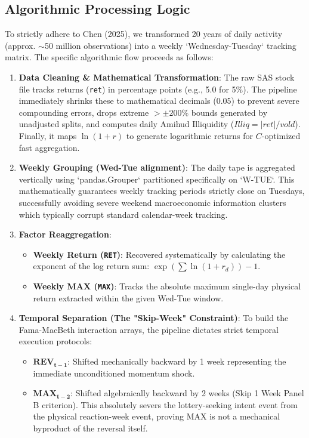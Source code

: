 \documentclass[11pt,a4paper]{article}
\begin{document}
\subsection{Algorithmic Processing Logic}
To strictly adhere to Chen (2025), we transformed 20 years of daily activity (approx. $\sim$50 million observations) into a weekly `Wednesday-Tuesday` tracking matrix. The specific algorithmic flow proceeds as follows:

\begin{enumerate}
    \item \textbf{Data Cleaning \& Mathematical Transformation}: The raw SAS stock file tracks returns (\texttt{ret}) in percentage points (e.g., 5.0 for 5\%). The pipeline immediately shrinks these to mathematical decimals ($0.05$) to prevent severe compounding errors, drops extreme $>\pm200\%$ bounds generated by unadjusted splits, and computes daily Amihud Illiquidity ($Illiq = |ret| / vold$). Finally, it maps $\ln(1+r)$ to generate logarithmic returns for $C$-optimized fast aggregation.
    \item \textbf{Weekly Grouping (Wed-Tue alignment)}: The daily tape is aggregated vertically using `pandas.Grouper` partitioned specifically on `W-TUE`. This mathematically guarantees weekly tracking periods strictly close on Tuesdays, successfully avoiding severe weekend macroeconomic information clusters which typically corrupt standard calendar-week tracking.
    \item \textbf{Factor Reaggregation}: 
    \begin{itemize}
        \item \textbf{Weekly Return (\texttt{RET})}: Recovered systematically by calculating the exponent of the log return sum: $\exp(\sum \ln(1+r_d)) - 1$.
        \item \textbf{Weekly MAX (\texttt{MAX})}: Tracks the absolute maximum single-day physical return extracted within the given Wed-Tue window.
    \end{itemize}
    \item \textbf{Temporal Separation (The "Skip-Week" Constraint)}: To build the Fama-MacBeth interaction arrays, the pipeline dictates strict temporal execution protocols:
    \begin{itemize}
        \item $\mathbf{REV_{t-1}}$: Shifted mechanically backward by 1 week representing the immediate unconditioned momentum shock.
        \item $\mathbf{MAX_{t-2}}$: Shifted algebraically backward by 2 weeks (Skip 1 Week Panel B criterion). This absolutely severs the lottery-seeking intent event from the physical reaction-week event, proving MAX is not a mechanical byproduct of the reversal itself.
    \end{itemize}
\end{enumerate}
\end{document}
